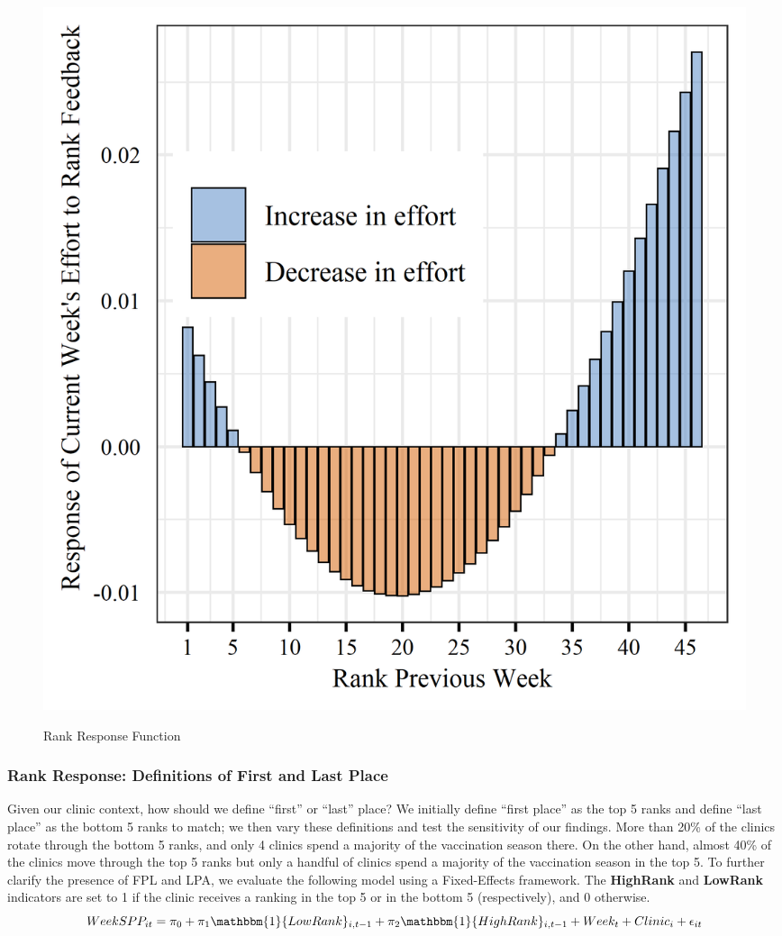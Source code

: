  \begin{figure}[p]
     \centering
     \caption{Rank Response Function} %
     \includegraphics[scale=1]{Figures/CC/Rank Response - Ranking Group (color).png}     
     \label{fig:rank_resp}
 \end{figure} 
 
 \subsubsection{Rank Response: Definitions of First and Last Place}
 Given our clinic context, how should we define “first” or “last” place? We initially define “first place” as the top 5 ranks and define “last place” as the bottom 5 ranks to match; we then vary these definitions and test the sensitivity of our findings. More than 20\% of the clinics rotate through the bottom 5 ranks, and only 4 clinics spend a majority of the vaccination season there. On the other hand, almost 40\% of the clinics move through the top 5 ranks but only a handful of clinics spend a majority of the vaccination season in the top 5. To further clarify the presence of FPL and LPA, we evaluate the following model using a Fixed-Effects framework. The \textbf{HighRank} and \textbf{LowRank} indicators are set to 1 if the clinic receives a ranking in the top 5 or in the bottom 5 (respectively), and 0 otherwise.
 \begin{equation} \label{rank_resp_ind} %
       WeekSPP_{it} = \pi_0 + \pi_1 \mathbbm{1}\{LowRank\}_{i,t-1} + \pi_2 \mathbbm{1}\{HighRank\}_{i,t-1} + Week_t + Clinic_i + \epsilon_{it}
 \end{equation}  
 
